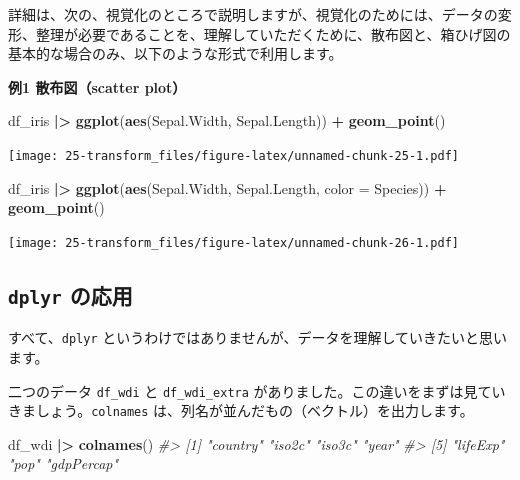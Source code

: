 \documentclass[
  xelatex, ja=standard]{bxjsbook}
\newenvironment{Shaded}{\begin{snugshade}}{\end{snugshade}}
\newcommand{\AttributeTok}[1]{\textcolor[rgb]{0.13,0.29,0.53}{#1}}
\newcommand{\CommentTok}[1]{\textcolor[rgb]{0.56,0.35,0.01}{\textit{#1}}}
\newcommand{\FunctionTok}[1]{\textcolor[rgb]{0.13,0.29,0.53}{\textbf{#1}}}
\newcommand{\NormalTok}[1]{#1}
\newcommand{\SpecialCharTok}[1]{\textcolor[rgb]{0.81,0.36,0.00}{\textbf{#1}}}
\theoremstyle{definition}
\theoremstyle{definition}
\theoremstyle{definition}
\theoremstyle{definition}
\theoremstyle{remark}
\begin{document}
詳細は、次の、視覚化のところで説明しますが、視覚化のためには、データの変形、整理が必要であることを、理解していただくために、散布図と、箱ひげ図の基本的な場合のみ、以下のような形式で利用します。

\textbf{例1 散布図（scatter plot）}

\begin{Shaded}
\begin{Highlighting}[]
\NormalTok{df\_iris }\SpecialCharTok{|\textgreater{}} \FunctionTok{ggplot}\NormalTok{(}\FunctionTok{aes}\NormalTok{(Sepal.Width, Sepal.Length)) }\SpecialCharTok{+} \FunctionTok{geom\_point}\NormalTok{()}
\end{Highlighting}
\end{Shaded}

\texttt{[image: 25-transform\_files/figure-latex/unnamed-chunk-25-1.pdf]}

\begin{Shaded}
\begin{Highlighting}[]
\NormalTok{df\_iris }\SpecialCharTok{|\textgreater{}} \FunctionTok{ggplot}\NormalTok{(}\FunctionTok{aes}\NormalTok{(Sepal.Width, Sepal.Length, }\AttributeTok{color =}\NormalTok{ Species)) }\SpecialCharTok{+}
  \FunctionTok{geom\_point}\NormalTok{()}
\end{Highlighting}
\end{Shaded}

\texttt{[image: 25-transform\_files/figure-latex/unnamed-chunk-26-1.pdf]}

\hypertarget{dplyr-ux306eux5fdcux7528}{%
\subsection{\texorpdfstring{\texttt{dplyr} の応用}{dplyr の応用}}\label{dplyr-ux306eux5fdcux7528}}

すべて、\texttt{dplyr} というわけではありませんが、データを理解していきたいと思います。

二つのデータ \texttt{df\_wdi} と \texttt{df\_wdi\_extra} がありました。この違いをまずは見ていきましょう。\texttt{colnames} は、列名が並んだもの（ベクトル）を出力します。

\begin{Shaded}
\begin{Highlighting}[]
\NormalTok{df\_wdi }\SpecialCharTok{|\textgreater{}} \FunctionTok{colnames}\NormalTok{()}
\CommentTok{\#\textgreater{} [1] "country"   "iso2c"     "iso3c"     "year"     }
\CommentTok{\#\textgreater{} [5] "lifeExp"   "pop"       "gdpPercap"}
\end{Highlighting}
\end{Shaded}
\end{document}
